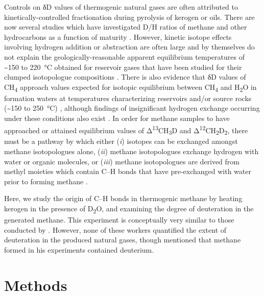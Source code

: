 Controls on δD values of thermogenic natural gases are often attributed
to kinetically-controlled fractionation during pyrolysis of kerogen or
oils. There are now several studies which have investigated D/H ratios
of methane and other hydrocarbons as a function of maturity \parencite{Sackett_1978_GCA,Berner++_1995_CG,Sackett+Conkright_1997_GCA,Tang++_2005_GCA,Ni++_2011_GCA}. However, kinetic isotope
effects involving hydrogen addition or abstraction are often large and
by themselves do not explain the geologically-reasonable apparent
equilibrium temperatures of \textasciitilde{}150 to 220~°C obtained for
reservoir gases that have been studied for their clumped isotopologue
compositions \parencite{Stolper++_2014_S,Stolper++_2015_GCA,Wang++_2015_S,Young++_2017_GCA}. There is also evidence that δD values of
CH\textsubscript{4} approach values expected for isotopic equilibrium
between CH\textsubscript{4} and H\textsubscript{2}O in formation waters
at temperatures characterizing reservoirs and/or source rocks
(\textasciitilde{}150 to 250~°C) \parencite{Clayton_2003_IMOG,Wang++_2015_S},
although findings of insignificant hydrogen exchange occurring under
these conditions also exist \parencite{Yeh+Epstein_1981_GCA}. In order for
methane samples to have approached or attained equilibrium values of
Δ\textsuperscript{13}CH\textsubscript{3}D and
Δ\textsuperscript{12}CH\textsubscript{2}D\textsubscript{2}, there must
be a pathway by which either (\emph{i}) isotopes can be exchanged
amongst methane isotopologues alone, (\emph{ii}) methane isotopologues
exchange hydrogen with water or organic molecules, or (\emph{iii})
methane isotopologues are derived from methyl moieties which contain
C--H bonds that have pre-exchanged with water prior to forming methane
\parencite{Hoering_1984_OG,Smith++_1985_OG,Schimmelmann++_1999_GCA,Lis++_2006_OG,Schimmelmann++_2006_AREarth}.

Here, we study the origin of C--H bonds in thermogenic methane by
heating kerogen in the presence of D\textsubscript{2}O, and examining
the degree of deuteration in the generated methane. This experiment is
conceptually very similar to those conducted by \textcite{Hoering_1984_OG,Lewan_1997_GCA,Schimmelmann++_2001_OG}. However, none of these workers
quantified the extent of deuteration in the produced natural gases,
though \textcite{Lewan_1997_GCA} mentioned that methane formed in his experiments
contained deuterium.

\section{Methods}\label{methods-3}

